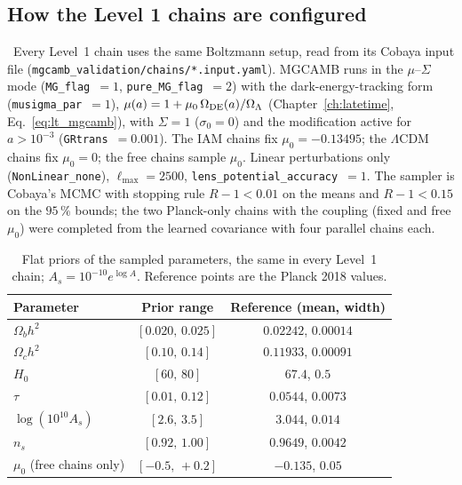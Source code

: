 \subsection{How the Level 1 chains are configured}\label{sec:chain_config}
\measured\ Every Level~1 chain uses the same Boltzmann setup, read from its Cobaya input file (\texttt{mgcamb\_validation/\allowbreak{}chains/\allowbreak{}*.input.yaml}).
MGCAMB runs in the $\mu$--$\Sigma$ mode (\texttt{MG\_flag}~$=1$, \texttt{pure\_MG\_flag}~$=2$) with the dark-energy-tracking form
(\texttt{musigma\_par}~$=1$), $\mu(a)=1+\mu_0\,\Omega_{\rm DE}(a)/\Omega_\Lambda$ (Chapter~\ref{ch:latetime}, Eq.~\eqref{eq:lt_mgcamb}), with
$\Sigma=1$ ($\sigma_0=0$) and the modification active for $a>10^{-3}$ (\texttt{GRtrans}~$=0.001$). The IAM chains fix
$\mu_0=-0.13495$; the $\Lambda$CDM chains fix $\mu_0=0$; the free chains sample $\mu_0$. Linear perturbations only (\texttt{NonLinear\_none}),
$\ell_{\max}=2500$, \texttt{lens\_potential\_accuracy}~$=1$. The sampler is Cobaya's MCMC with stopping rule $R-1<0.01$ on the means and $R-1<0.15$
on the $95\,\%$ bounds; the two Planck-only chains with the coupling (fixed and free $\mu_0$) were completed from the learned covariance with four parallel
chains each.
\begin{table}[htbp]\centering\small
\caption[Priors of the Level 1 chains]{Flat priors of the sampled parameters, the same in every Level~1 chain; $A_s=10^{-10}e^{\log A}$. Reference
points are the Planck 2018 values. \measured}\label{tab:chain_priors}
\begin{tabular}{lcc}\toprule
Parameter & Prior range & Reference (mean, width)\\\midrule
$\Omega_bh^2$ & $[0.020,\,0.025]$ & $0.02242$, $0.00014$\\
$\Omega_ch^2$ & $[0.10,\,0.14]$ & $0.11933$, $0.00091$\\
$H_0$ & $[60,\,80]$ & $67.4$, $0.5$\\
$\tau$ & $[0.01,\,0.12]$ & $0.0544$, $0.0073$\\
$\log(10^{10}A_s)$ & $[2.6,\,3.5]$ & $3.044$, $0.014$\\
$n_s$ & $[0.92,\,1.00]$ & $0.9649$, $0.0042$\\
$\mu_0$ (free chains only) & $[-0.5,\,+0.2]$ & $-0.135$, $0.05$\\\bottomrule
\end{tabular}
\end{table}
